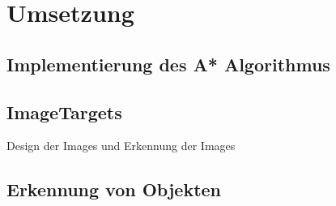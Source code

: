 \chapter{Umsetzung}
\label{sec:Umsetzung}
\section{Implementierung des A* Algorithmus}
\section{ImageTargets}
Design der Images und Erkennung der Images
\section{Erkennung von Objekten}


